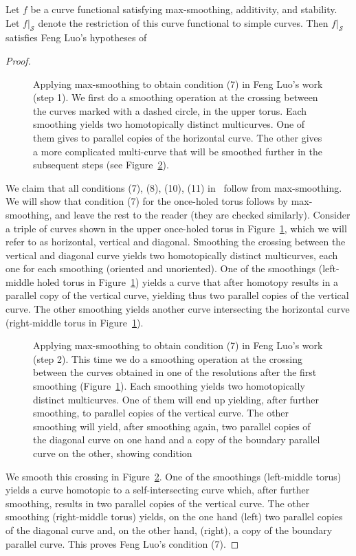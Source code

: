 \begin{proposition}
Let $f$ be a curve functional satisfying max-smoothing, additivity, and stability. Let $f|_{\mathcal{S}}$ denote the restriction of this curve functional to simple curves.
Then $f|_{\mathcal{S}}$ satisfies Feng Luo's hypotheses of \cite[Theorem~5.1]{Lu10}
\label{prop:feng}
\end{proposition}
\begin{proof}
  \begin{figure}
\caption{Applying max-smoothing to obtain condition (7) in Feng Luo's work (step 1). We first do a smoothing operation at the crossing between the curves marked with a dashed circle, in the upper torus. Each smoothing yields two homotopically distinct multicurves. One of them gives to parallel copies of the horizontal curve. The other gives a more complicated multi-curve that will be smoothed further in the subsequent steps (see Figure~\ref{fig:luo2}).
}
\label{fig:luo1}
\end{figure}

We claim that all conditions (7), (8), (10), (11) in~\cite[Theorem~5.1]{Lu10} follow from max-smoothing.
We will show that condition (7) for the once-holed torus follows by max-smoothing, and leave the rest to the reader (they are checked similarly). Consider a triple of curves shown in the upper once-holed torus in Figure~\ref{fig:luo1}, which we will refer to as horizontal, vertical and diagonal. Smoothing the crossing between the vertical and diagonal curve yields two homotopically distinct multicurves, each one for each smoothing (oriented and unoriented).
One of the smoothings (left-middle holed torus in Figure~\ref{fig:luo1}) yields a curve that after homotopy results in a parallel copy of the vertical curve, yielding thus two parallel copies of the vertical curve. The other smoothing yields another curve intersecting the horizontal curve (right-middle torus in Figure~\ref{fig:luo1}).

  \begin{figure}
\caption{Applying max-smoothing to obtain condition (7) in Feng Luo's work (step 2). This time we do a smoothing operation at the crossing between the curves obtained in one of the resolutions after the first smoothing (Figure~\ref{fig:luo1}). Each smoothing yields two homotopically distinct multicurves. One of them will end up yielding, after further smoothing, to parallel copies of the vertical curve. The other smoothing will yield, after smoothing again, two parallel copies of the diagonal curve on one hand and a copy of the boundary parallel curve on the other, showing condition 
}
\label{fig:luo2}
\end{figure}
We smooth this crossing in  Figure~\ref{fig:luo2}. One of the smoothings (left-middle torus) yields a curve homotopic to a self-intersecting curve which, after further smoothing, results in two parallel copies of the vertical curve.
The other smoothing (right-middle torus) yields, on the one hand (left) two parallel copies of the diagonal curve and, on the other hand, (right),  a copy of the boundary parallel curve. This proves Feng Luo's condition (7).
\end{proof}

